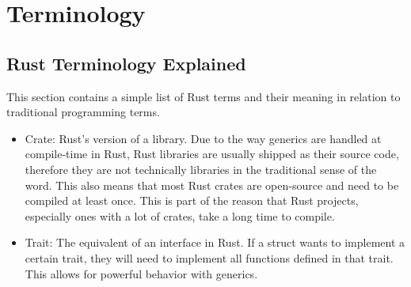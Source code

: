 \chapter{Terminology}

\section{Rust Terminology Explained} \label{cha3:rustterms}
This section contains a simple list of Rust terms and their meaning in relation to traditional programming terms.
\begin{itemize}
    \item Crate: Rust's version of a library. Due to the way generics are handled at compile-time in Rust, Rust libraries are usually shipped as their source code, therefore they are not technically libraries in the traditional sense of the word. This also means that most Rust crates are open-source and need to be compiled at least once. This is part of the reason that Rust projects, especially ones with a lot of crates, take a long time to compile.
    \item Trait: The equivalent of an interface in Rust. If a struct wants to implement a certain trait, they will need to implement all functions defined in that trait. This allows for powerful behavior with generics.
\end{itemize}
